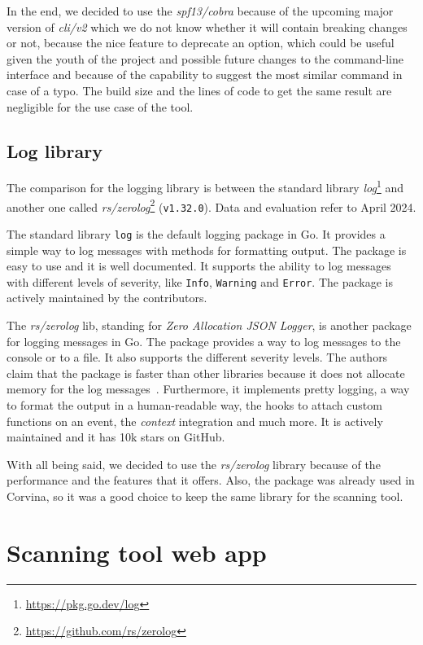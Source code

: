 In the end, we decided to use the \textit{spf13/cobra} because of the upcoming major version of \textit{cli/v2} which we do not know whether it will contain breaking changes or not, because the nice feature to deprecate an option, which could be useful given the youth of the project and possible future changes to the command-line interface and because of the capability to suggest the most similar command in case of a typo. The build size and the lines of code to get the same result are negligible for the use case of the tool.

\subsection{Log library}

The comparison for the logging library is between the standard library \textit{log}\footnote{\url{https://pkg.go.dev/log}} and another one called \textit{rs/zerolog}\footnote{\url{https://github.com/rs/zerolog}} (\texttt{v1.32.0}). Data and evaluation refer to April 2024.

The standard library \texttt{log} is the default logging package in Go. It provides a simple way to log messages with methods for formatting output. The package is easy to use and it is well documented. It supports the ability to log messages with different levels of severity, like \texttt{Info}, \texttt{Warning} and \texttt{Error}. The package is actively maintained by the contributors.

The \textit{rs/zerolog} lib, standing for \textit{Zero Allocation JSON Logger}, is another package for logging messages in Go. The package provides a way to log messages to the console or to a file. It also supports the different severity levels. The authors claim that the package is faster than other libraries because it does not allocate memory for the log messages~\cite{go-zerolog-benchmarks}. Furthermore, it implements pretty logging, a way to format the output in a human-readable way, the hooks to attach custom functions on an event, the \textit{context} integration and much more. It is actively maintained and it has 10k stars on GitHub.

With all being said, we decided to use the \textit{rs/zerolog} library because of the performance and the features that it offers. Also, the package was already used in Corvina, so it was a good choice to keep the same library for the scanning tool.

\section{Scanning tool web app}

